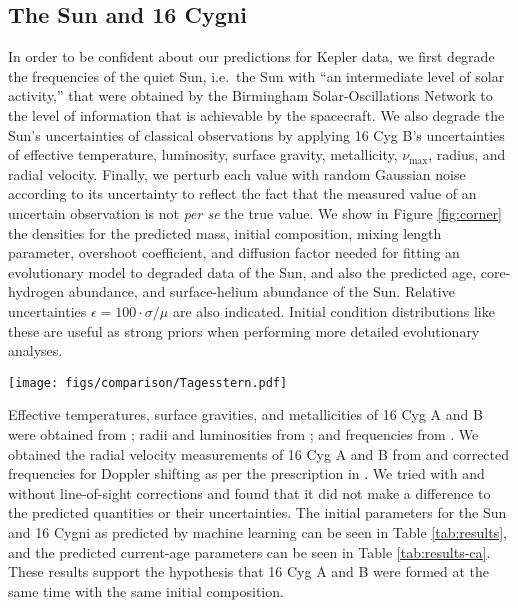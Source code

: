 \documentclass[iop,apj,twocolappendix]{emulateapj}
\begin{document}
\subsection{The Sun and 16 Cygni}
In order to be confident about our predictions for Kepler data, we first degrade the frequencies of the quiet Sun, i.e.\ the Sun with ``an intermediate level of solar activity,'' that were obtained by the Birmingham Solar-Oscillations Network \citep[BiSON,][]{2014MNRAS.439.2025D} to the level of information that is achievable by the spacecraft. We also degrade the Sun's uncertainties of classical observations by applying 16 Cyg B's uncertainties of effective temperature, luminosity, surface gravity, metallicity, $\nu_{\max}$, radius, and radial velocity. Finally, we perturb each value with random Gaussian noise according to its uncertainty to reflect the fact that the measured value of an uncertain observation is not \emph{per se} the true value. We show in Figure \ref{fig:corner} the densities for the predicted mass, initial composition, mixing length parameter, overshoot coefficient, and diffusion factor needed for fitting an evolutionary model to degraded data of the Sun, and also the predicted age, core-hydrogen abundance, and surface-helium abundance of the Sun. Relative uncertainties $\epsilon=100\cdot\sigma/\mu$ are also indicated. Initial condition distributions like these are useful as strong priors when performing more detailed evolutionary analyses. 

\begin{figure*}
    \centering
    \texttt{[image: figs/comparison/Tagesstern.pdf]}
    \caption{Predictions from machine learning of initial (top six) and current-age (bottom three) stellar parameters for degraded solar data. Labels are placed at the mean and 3$\sigma$ levels. Dotted lines indicate the median and quartiles. Relative uncertainties $\epsilon$ are shown beside each plot. Note that the overshoot parameter applies to all convective boundaries and is not modified over the course of evolution; i.e.\ a non-zero value does not imply that the star has a convective core at the present age. }
    \label{fig:corner}
\end{figure*}

Effective temperatures, surface gravities, and metallicities of 16 Cyg A and B were obtained from \citet{2009A&A...508L..17R}; radii and luminosities from \citet{2013MNRAS.433.1262W}; and frequencies from \citet{2015MNRAS.446.2959D}. We obtained the radial velocity measurements of 16 Cyg A and B from \citet{2002ApJS..141..503N} and corrected frequencies for Doppler shifting as per the prescription in \citet{2014MNRAS.445L..94D}. We tried with and without line-of-sight corrections and found that it did not make a difference to the predicted quantities or their uncertainties. The initial parameters for the Sun and 16 Cygni as predicted by machine learning can be seen in Table \ref{tab:results}, and the predicted current-age parameters can be seen in Table \ref{tab:results-ca}. These results support the hypothesis that 16 Cyg A and B were formed at the same time with the same initial composition. 
\end{document}
